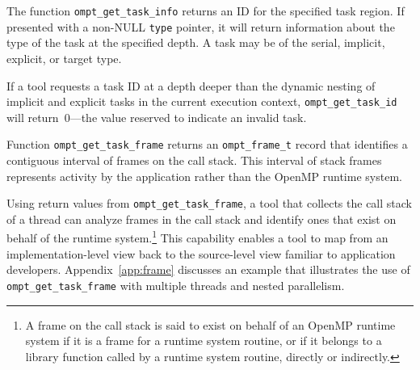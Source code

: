 \documentclass{article}
\begin{document}
The function \verb|ompt_get_task_info| returns an ID for the specified task region. If presented with a non-NULL \verb|type| pointer, it will return information about the type of the task at the specified depth. A task may be of the serial, implicit, explicit, or target type.

\noindent
 If a tool  requests a task ID at a depth deeper than the  dynamic nesting of implicit and explicit tasks in the current execution context,  {\tt ompt\_get\_task\_id} will return~0---the value reserved to indicate an invalid task.

 
 
 
Function \verb|ompt_get_task_frame| returns an \verb|ompt_frame_t| record that identifies a contiguous interval of frames on the call stack. This interval of stack frames represents activity by the application rather than the OpenMP runtime system. 


\noindent
Using return values from  \verb|ompt_get_task_frame|, a tool that collects the call stack of a thread can analyze  frames in the call stack and identify ones that exist on behalf of the runtime system.\footnote{A frame on the call stack is said to exist on behalf of an OpenMP runtime system if it is a frame for a runtime system routine, or if it belongs to a library function called by a runtime system routine, directly or indirectly.} 
This capability enables a tool to map from an implementation-level view back to the source-level view familiar to application developers. 
Appendix~\ref{app:frame} discusses  an example that illustrates the use of \verb|ompt_get_task_frame| with multiple threads and nested parallelism.
\end{document}
